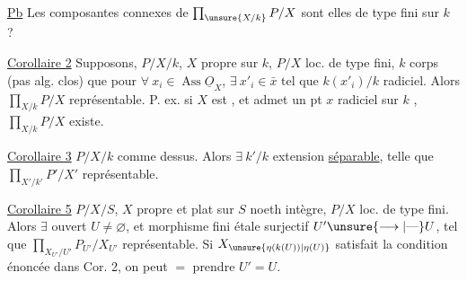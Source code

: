 \uline{Pb} Les composantes connexes de $\prod_{\unsure{X/k}}P/X$ sont elles de type fini sur $k$ ?

\uline{Corollaire 2} Supposons,    $P/X/k$, $X$ propre sur $k$, $P/X$ loc. de type fini, $k$ corps (pas   alg. clos) que \deleted{$\forall$} pour $\forall\ x_i\in\operatorname{Ass}\underline{O}_X$, $\exists\ x'_i\in\bar x$ tel que $k(x'_i)/k$ radiciel.  Alors $\prod_{X/k}P/X$ représentable.
P. ex. si $X$  est  , et admet un pt $x$ radiciel sur $k$ , $\prod_{X/k}P/X$ existe.

\uline{Corollaire 3} $P/X/k$ comme dessus. Alors $\exists\ k'/k$ extension  \uline{séparable}, telle que $\prod_{X'/k'}P'/X'$ représentable.


\uline{Corollaire 5} $P/X/S$, $X$ propre et plat sur $S$ noeth intègre, $P/X$ loc. de type fini. Alors $\exists$  ouvert $U\ne\varnothing$, et morphisme fini étale surjectif $U'\unsure{\longrightarrow|\text{—}}U$, tel que $\prod_{X_{U'}/U'}P_{U'}/X_{U'}$ représentable. Si $X_{\unsure{\eta(k(U))|\eta(U)}}$ satisfait la condition énoncée dans Cor. 2, on peut $=$ prendre $U'=U$.
